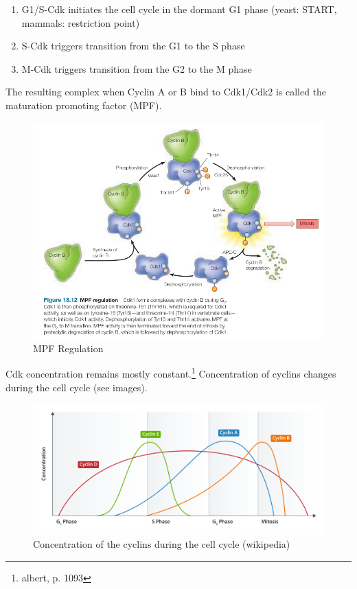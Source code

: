 \documentclass{article}
\begin{document}
	\begin{enumerate}[label=\textbullet]
		\item G1/S-Cdk initiates the cell cycle in the dormant G1 phase  (yeast: START, mammals: restriction point)
		\item S-Cdk triggers transition from the G1 to the S phase 
		\item M-Cdk triggers transition from the G2 to the M phase 
	\end{enumerate}

	The resulting complex when Cyclin A or B bind to Cdk1/Cdk2 is called the maturation promoting factor (MPF).
	
	\begin{figure}[H]
		\centering
		\includegraphics[width=\linewidth]{mpf_regulation_cooper.png}
		\caption{MPF Regulation}
	\end{figure}

	Cdk concentration remains mostly constant.\footnote{albert, p. 1093} Concentration of cyclins changes during the cell cycle (see images).
	
	\begin{figure}[H]
		\centering
		\includegraphics[width=\linewidth]{cyclin_activity_wikipedia.png}
		\caption{Concentration of the cyclins during the cell cycle (wikipedia)}
	\end{figure}
	
\end{document}
